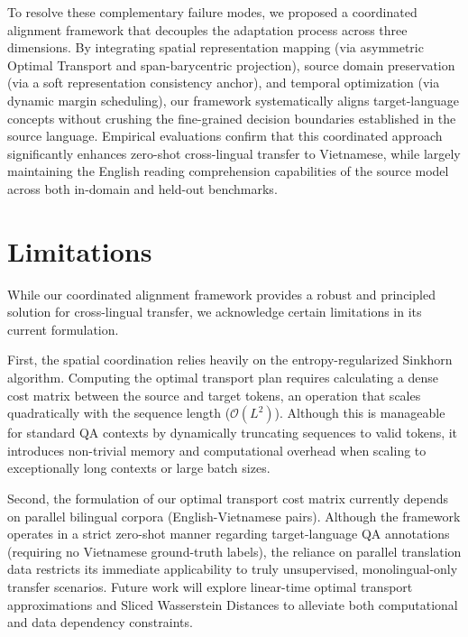 \documentclass[11pt]{article}
\begin{document}
To resolve these complementary failure modes, we proposed a coordinated alignment framework that decouples the adaptation process across three dimensions. By integrating spatial representation mapping (via asymmetric Optimal Transport and span-barycentric projection), source domain preservation (via a soft representation consistency anchor), and temporal optimization (via dynamic margin scheduling), our framework systematically aligns target-language concepts without crushing the fine-grained decision boundaries established in the source language. Empirical evaluations confirm that this coordinated approach significantly enhances zero-shot cross-lingual transfer to Vietnamese, while largely maintaining the English reading comprehension capabilities of the source model across both in-domain and held-out benchmarks.

\section*{Limitations}
While our coordinated alignment framework provides a robust and principled solution for cross-lingual transfer, we acknowledge certain limitations in its current formulation. 

First, the spatial coordination relies heavily on the entropy-regularized Sinkhorn algorithm. Computing the optimal transport plan requires calculating a dense cost matrix between the source and target tokens, an operation that scales quadratically with the sequence length ($\mathcal{O}(L^2)$). Although this is manageable for standard QA contexts by dynamically truncating sequences to valid tokens, it introduces non-trivial memory and computational overhead when scaling to exceptionally long contexts or large batch sizes. 

Second, the formulation of our optimal transport cost matrix currently depends on parallel bilingual corpora (English-Vietnamese pairs). Although the framework operates in a strict zero-shot manner regarding target-language QA annotations (requiring no Vietnamese ground-truth labels), the reliance on parallel translation data restricts its immediate applicability to truly unsupervised, monolingual-only transfer scenarios. Future work will explore linear-time optimal transport approximations and Sliced Wasserstein Distances to alleviate both computational and data dependency constraints.
\end{document}
